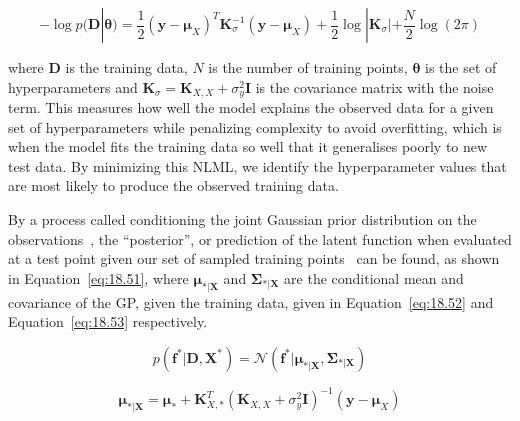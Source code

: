 \documentclass[12pt]{article}
\begin{document}
    \begin{equation}
        -\log p(\mathbf{D}|\boldsymbol{\theta}) = \frac{1}{2} (\mathbf{y} - \boldsymbol{\mu}_X)^T \mathbf{K}_{\sigma}^{-1} (\mathbf{y} - \boldsymbol{\mu}_X) + \frac{1}{2} \log |\mathbf{K}_{\sigma}| + \frac{N}{2} \log(2\pi)\label{eq:NLML}
    \end{equation}


    \noindent where $\mathbf{D}$ is the training data, $N$ is the number of training points, $\boldsymbol{\theta}$ is the set of hyperparameters and $\mathbf{K}_{\sigma} = \mathbf{K}_{X,X} + \sigma^2_y \mathbf{I}$ is the covariance matrix with the noise term.
    This measures how well the model explains the observed data for a given set of hyperparameters while penalizing complexity to avoid overfitting, which is when the model fits the training data so well that it generalises poorly to new test data.
    By minimizing this NLML, we identify the hyperparameter values that are most likely to produce the observed training data.


    By a process called conditioning the joint Gaussian prior distribution on the observations~\cite{rasmussen2006gaussian}, the ``posterior'', or prediction of the latent function when evaluated at a test point given our set of sampled training points~\cite{murphy2023probabilistic} can be found, as shown in Equation~\ref{eq:18.51}, where $\boldsymbol{\mu}_{*\vert \mathbf{X}}$ and $\boldsymbol{\Sigma}_{*\vert \mathbf{X}}$ are the conditional mean and covariance of the GP, given the training data, given in Equation~\ref{eq:18.52} and Equation~\ref{eq:18.53} respectively.

    \begin{equation}
        p(\mathbf{f}^* \vert \mathbf{D}, \mathbf{X}^*) = \mathcal{N}(\mathbf{f}^* \vert \boldsymbol{\mu}_{*\vert \mathbf{X}}, \boldsymbol{\Sigma}_{*\vert \mathbf{X}})\label{eq:18.51}
    \end{equation}

    \begin{equation}
        \boldsymbol{\mu}_{*\vert \mathbf{X}} = \boldsymbol{\mu}_* + \mathbf{K}_{X,*}^T (\mathbf{K}_{X,X} + \sigma^2_y \mathbf{I})^{-1} (\mathbf{y} - \boldsymbol{\mu}_X)\label{eq:18.52}
    \end{equation}
\end{document}
